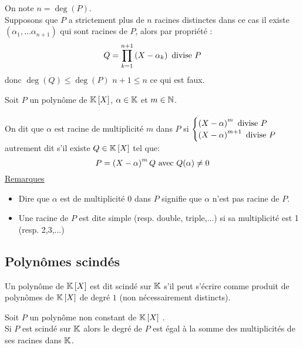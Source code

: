 \begin{dem}
    On note \(n = \deg(P)\).\\
    Supposons que \(P\) a strictement plus de \(n\) racines distinctes dans ce cas il existe \((\alpha_1, \dots \alpha_{n+1})\) qui sont racines de \(P\), alors par propriété : \[Q = \prod_{k=1}^{n+1} \left(X - \alpha_k\right) \text{ divise } P\]
    donc \(\deg(Q) \leq \deg(P)\) \ie \(n+1 \leq n\) ce qui est faux.
\end{dem}

\begin{defprop}
    Soit \(P\) un polynôme  de \(\mathbb{K}\left[X\right]\), \(\alpha \in \mathbb{K}\) et \(m \in \mathbb{N}\).\\~\\
    On dit que \(\alpha\) est racine de multiplicité \(m\) dans \(P\) si \(\begin{cases}
        \left(X-\alpha\right)^m \text{ divise } P \\
        \left(X - \alpha\right) ^{m+1} \text{ divise } P
    \end{cases}\)\\
    autrement  dit s'il existe \(Q \in \mathbb{K} \left[X\right]\) tel que: \[P = \left(X-\alpha\right)^m Q \text{ avec } Q(\alpha) \neq 0\]
    \underline{Remarques}\\
    \begin{itemize}
        \item Dire que \(\alpha\) est de multiplicité \(0\) dans \(P\) signifie que \(\alpha\) n'est pas racine de \(P\).
        \item Une racine de \(P\) est dite simple (resp. double, triple,...) si sa multiplicité est 1 (resp. 2,3,...)
    \end{itemize}
\end{defprop}
\subsection{Polynômes scindés}
\begin{defi}
    Un polynôme de \(\mathbb{K} \left[X\right]\) est dit scindé sur \(\mathbb{K}\) s'il peut s'écrire comme produit de polynômes de \(\mathbb{K} \left[X\right]\) de degré \(1\) (non nécessairement distincts).
\end{defi}
\begin{defprop}
    Soit \(P\) un polynôme non constant de \(\mathbb{K} \left[X\right]\) . \\
    Si \(P\) est scindé sur \(\mathbb{K}\) alors le degré de \(P\) est égal à la somme des multiplicités de ses racines dans \(\mathbb{K}\).
\end{defprop}

